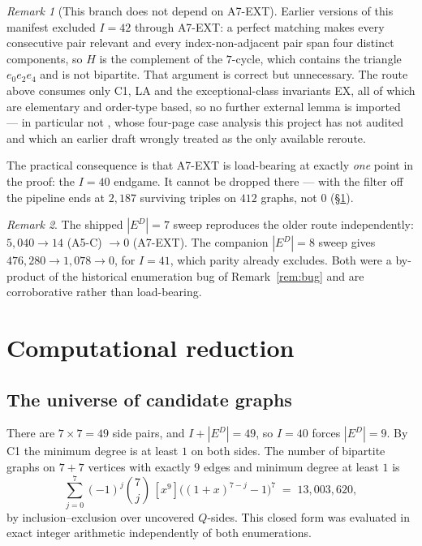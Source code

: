 \documentclass[11pt,a4paper]{article}
\theoremstyle{plain}
\theoremstyle{definition}
\theoremstyle{remark}
\newtheorem*{remark}{Remark}
\newcommand{\ED}{E^{D}}
\begin{document}
\begin{remark}[This branch does not depend on \textsf{A7-EXT}]\label{rem:i42noa7}
Earlier versions of this manifest excluded $I=42$ through \textsf{A7-EXT}: a
perfect matching makes every consecutive pair relevant and every index-non-adjacent
pair span four distinct components, so $H$ is the complement of the $7$-cycle,
which contains the triangle $e_0e_2e_4$ and is not bipartite. That argument is
correct but unnecessary. The route above consumes only \textsf{C1},
\textsf{LA} and the exceptional-class invariants \textsf{EX}, all of which are
elementary and order-type based, so no further external lemma is imported ---
in particular not \cite[Lemma 3]{CernyEtAl2003}, whose four-page case analysis
this project has not audited and which an earlier draft wrongly treated as the
only available reroute.

The practical consequence is that \textsf{A7-EXT} is load-bearing at exactly
\emph{one} point in the proof: the $I=40$ endgame. It cannot be dropped there ---
with the filter off the pipeline ends at $2{,}187$ surviving triples on $412$
graphs, not $0$ (\S\ref{sec:comp}).
\end{remark}

\begin{remark}
The shipped $|\ED|=7$ sweep reproduces the older route independently:
$5{,}040 \to 14$ (\textsf{A5-C}) $\to 0$ (\textsf{A7-EXT}). The companion
$|\ED|=8$ sweep gives $476{,}280\to1{,}078\to0$, for $I=41$, which parity already
excludes. Both were a by-product of the historical enumeration bug of
Remark~\ref{rem:bug} and are corroborative rather than load-bearing.
\end{remark}

\section{Computational reduction}\label{sec:comp}

\subsection{The universe of candidate graphs}

There are $7\times 7 = 49$ side pairs, and $I+|\ED|=49$, so $I=40$ forces
$|\ED|=9$. By \textsf{C1} the minimum degree is at least $1$ on both sides. The
number of bipartite graphs on $7+7$ vertices with exactly $9$ edges and minimum
degree at least $1$ is
\[
  \sum_{j=0}^{7}(-1)^j\binom{7}{j}\,[x^9]\bigl((1+x)^{7-j}-1\bigr)^{7}
  \;=\; 13{,}003{,}620 ,
\]
by inclusion--exclusion over uncovered $Q$-sides. This closed form was evaluated
in exact integer arithmetic independently of both enumerations.
\end{document}
